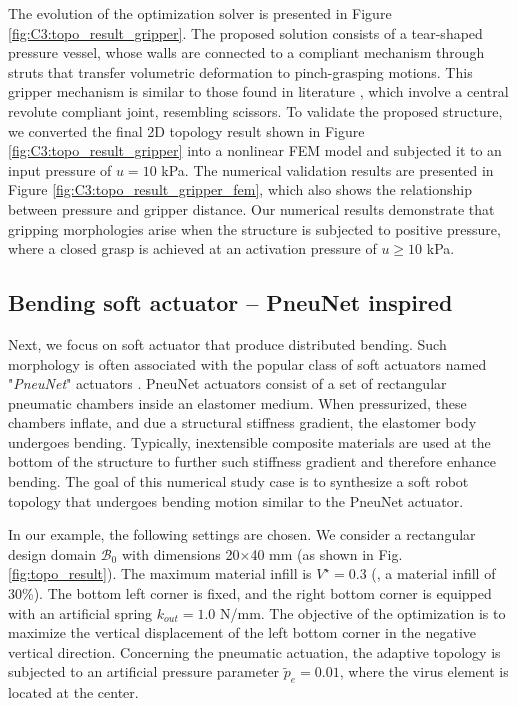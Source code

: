 The evolution of the optimization solver is presented in Figure \ref{fig:C3:topo_result_gripper}. The proposed solution consists of a tear-shaped pressure vessel, whose walls are connected to a compliant mechanism through struts that transfer volumetric deformation to pinch-grasping motions. This gripper mechanism is similar to those found in literature \cite{Gain2013Dec,Bendsoe2003}, which involve a central revolute compliant joint, resembling scissors. To validate the proposed structure, we converted the final 2D topology result shown in Figure \ref{fig:C3:topo_result_gripper} into a nonlinear FEM model and subjected it to an input pressure of $u = 10$ \si{\kilo \pascal}. The numerical validation results are presented in Figure \ref{fig:C3:topo_result_gripper_fem}, which also shows the relationship between pressure and gripper distance. Our numerical results demonstrate that gripping morphologies arise when the structure is subjected to positive pressure, where a closed grasp is achieved at an activation pressure of $u \ge 10$ \si{\kilo \pascal}.

\subsection{Bending soft actuator -- PneuNet inspired}
\label{sec:C3:PneuNet_results}
Next, we focus on soft actuator that produce distributed bending. Such morphology is often associated with the popular class of soft actuators named "\emph{PneuNet}" actuators \cite{Polygerinos2013,Polygerinos2015,Galloway2016,Hughes2016Nov,Marchese2015}. PneuNet actuators consist of a set of rectangular pneumatic chambers inside an elastomer medium. When pressurized, these chambers inflate, and due a structural stiffness gradient, the elastomer body undergoes bending. Typically, inextensible composite materials are used at the bottom of the structure to further such stiffness gradient and therefore enhance bending. The goal of this numerical study case is to synthesize a soft robot topology that undergoes bending motion similar to the PneuNet actuator. 

In our example, the following settings are chosen. We consider a rectangular design domain $\mathcal{B}_0$ with dimensions 20$\times$40 mm (as shown in Fig. \ref{fig:topo_result}). The maximum material infill is $V^\star = 0.3$ (\ie, a material infill of 30\%). The bottom left corner is fixed, and the right bottom corner is equipped with an artificial spring $k_{out} = 1.0$ N/mm. The objective of the optimization is to maximize the vertical displacement of the left bottom corner in the negative vertical direction. Concerning the pneumatic actuation, the adaptive topology is subjected to an artificial pressure parameter $\tilde{p}_e = 0.01$, where the virus element is located at the center.

